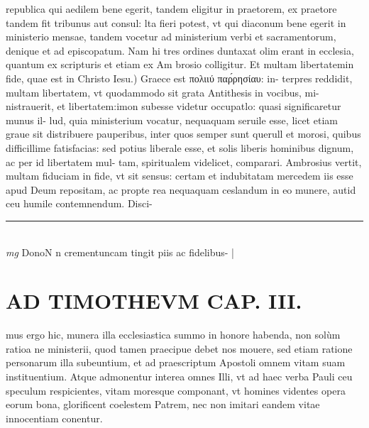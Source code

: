 \documentclass{article}
\begin{document}
\begin{pages}
republica qui aedilem bene egerit, tandem eligitur in praetorem, ex praetore tandem fit tribunus aut consul: lta fieri potest, vt qui diaconum bene egerit in ministerio mensae, tandem vocetur ad ministerium verbi et sacramentorum, denique et ad episcopatum. Nam hi tres ordines duntaxat olim erant in ecclesia, quantum ex scripturis et etiam ex Am brosio colligitur.  \pend\pstart Et multam libertatemin fide, quae est in Christo Iesu.) Graece est πολιιύ παρ́ρησίαυ: in- terpres reddidit, multam libertatem, vt quodammodo sit grata Antithesis in vocibus, mi- nistrauerit, et libertatem:imon subesse videtur occupatlo: quasi significaretur munus il- lud, quia ministerium vocatur, nequaquam seruile esse, licet etiam graue sit distribuere pauperibus, inter quos semper sunt querull et morosi, quibus difficillime fatisfacias: sed potius liberale esse, et solis liberis hominibus dignum, ac per id libertatem mul- tam, spiritualem videlicet, comparari. Ambrosius vertit, multam fiduciam in fide, vt sit sensus: certam et indubitatam mercedem iis esse apud Deum repositam, ac propte rea nequaquam ceslandum in eo munere, autid ceu humile contemnendum. Disci-  \pend
\vspace{0.5cm}\noindent
\vspace{0.2cm}\rule{1cm}{0.2pt}\\ 
\hspace{0.2cm}\textit{mg}
\footnotesize DonoN n crementuncam tingit piis ac fidelibus- 
\normalsize| 
\section*{AD TIMOTHEVM CAP. III. }
\marginpar{[ p.87 ]}\pstart mus ergo hic, munera illa ecclesiastica summo in honore habenda, non solùm ratioa ne ministerii, quod tamen praecipue debet nos mouere, sed etiam ratione personarum illa subeuntium, et ad praescriptum Apostoli omnem vitam suam instituentium. Atque  admonentur interea omnes Illi, vt ad haec verba Pauli ceu speculum respicientes, vitam moresque componant, vt homines videntes opera eorum bona, glorificent coelestem Patrem, nec non imitari eandem vitae innocentiam conentur.  \pend
{}
{}

\end{pages}
\end{document}
